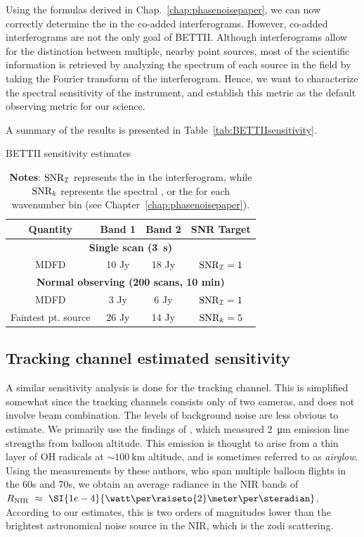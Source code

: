Using the formulas derived in Chap.~\ref{chap:phasenoisepaper}, we can now correctly determine the \SNR in the co-added interferograms. However, co-added interferograms are not the only goal of BETTII. Although interferograms allow for the distinction between multiple, nearby point sources, most of the scientific information is retrieved by analyzing the spectrum of each source in the field by taking the Fourier transform of the interferogram. Hence, we want to characterize the spectral sensitivity of the instrument, and establish this metric as the default observing metric for our science.

A summary of the results is presented in Table~\ref{tab:BETTIIsensitivity}.

\begin{table}[ht!]
\begin{center}
\caption{BETTII sensitivity estimates}
\label{tab:BETTIIsensitivity}
\vspace{-0.5cm}
\begin{longtable}{cccc}
\toprule
  Quantity   & Band 1 &  Band 2 & SNR Target \\
     \midrule 
 \multicolumn{4}{c}{\textbf{Single scan (\SI{3}{\second})}} \\
MDFD & 10 Jy  & 18 Jy & $\textrm{SNR}_{\mathcal{I}} = 1$\\ 
\midrule
\multicolumn{4}{c}{\textbf{Normal observing (200 scans, 10 min)}} \\
MDFD & 3 Jy  & 6 Jy & $\textrm{SNR}_{\mathcal{I}} = 1$\\ 
Faintest pt. source & 26 Jy  & 14 Jy & $\textrm{SNR}_k = 5$\\ 
\bottomrule 
\end{longtable} 
\caption*{\textbf{Notes}: $\textrm{SNR}_{\mathcal{I}}$ represents the \SNR in the interferogram, while $\textrm{SNR}_k$ represents the spectral \SNR, or the \SNR for each wavenumber bin (see Chapter~\ref{chap:phasenoisepaper}).}
\end{center}
\end{table} 


\subsection{Tracking channel estimated sensitivity}
A similar sensitivity analysis is done for the tracking channel. This is simplified somewhat since the tracking channels consists only of two cameras, and does not involve beam combination. The levels of background noise are less obvious to estimate. We primarily use the findings of \citet{Matsumoto:1994io}, which measured \SI{2}{\micro\meter} emission line strengths from balloon altitude. This emission is thought to arise from a thin layer of OH radicals at $\sim\SI{100}{\kilo\meter}$ altitude, and is sometimes referred to as \textit{airglow}. Using the measurements by these authors, who span multiple balloon flights in the 60s and 70s, we obtain an average radiance in the NIR bands of $\Rnir~\approx~\SI{1e-4}{\watt\per\raiseto{2}\meter\per\steradian}$. According to our estimates, this is two orders of magnitudes lower than the brightest astronomical noise source in the NIR, which is the zodi scattering.

